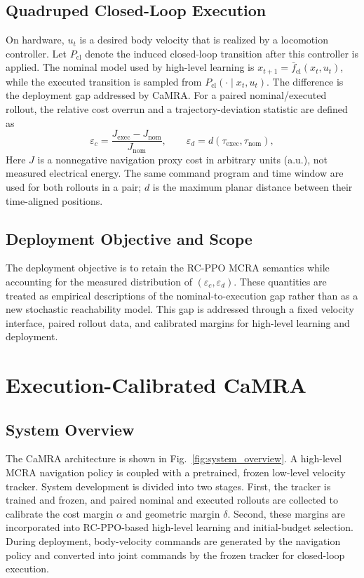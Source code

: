 \documentclass[conference]{IEEEtran}
\begin{document}
\subsection{Quadruped Closed-Loop Execution}
On hardware, $u_t$ is a desired body velocity that is realized by a locomotion
controller. Let $P_{\mathrm{cl}}$ denote the induced closed-loop transition after
this controller is applied. The nominal model used by high-level learning is
$x_{t+1}=\bar f_{\mathrm{cl}}(x_t,u_t)$, while the executed transition is sampled
from $P_{\mathrm{cl}}(\cdot\mid x_t,u_t)$. The difference is the deployment gap
addressed by CaMRA. For a paired nominal/executed rollout, the relative
cost overrun and a trajectory-deviation statistic are defined as
\begin{equation}
\varepsilon_c=\frac{J_{\mathrm{exec}}-J_{\mathrm{nom}}}{J_{\mathrm{nom}}},
\qquad
\varepsilon_d=d(\tau_{\mathrm{exec}},\tau_{\mathrm{nom}}),
\label{eq:execution_errors}
\end{equation}
Here $J$ is a nonnegative navigation proxy cost in arbitrary units (a.u.),
not measured electrical energy. The same command program and time window are used for both rollouts in a pair;
$d$ is the maximum planar distance between their time-aligned positions.

\subsection{Deployment Objective and Scope}
The deployment objective is to retain the RC-PPO MCRA semantics while accounting
for the measured distribution of $(\varepsilon_c,\varepsilon_d)$. These quantities
are treated as empirical descriptions of the nominal-to-execution gap rather
than as a new stochastic reachability model. This gap is addressed through a
fixed velocity interface, paired rollout data, and calibrated margins for
high-level learning and deployment.

\section{Execution-Calibrated CaMRA}
\subsection{System Overview}
The CaMRA architecture is shown in Fig.~\ref{fig:system_overview}. A high-level
MCRA navigation policy is coupled with a pretrained, frozen low-level velocity
tracker. System development is divided into two stages. First, the tracker is trained and
frozen, and paired nominal and executed rollouts are collected to calibrate the
cost margin $\alpha$ and geometric margin $\delta$. Second, these margins are
incorporated into RC-PPO-based high-level learning and initial-budget selection.
During deployment, body-velocity commands are generated by the navigation policy
and converted into joint commands by the frozen tracker for closed-loop execution.
\end{document}

